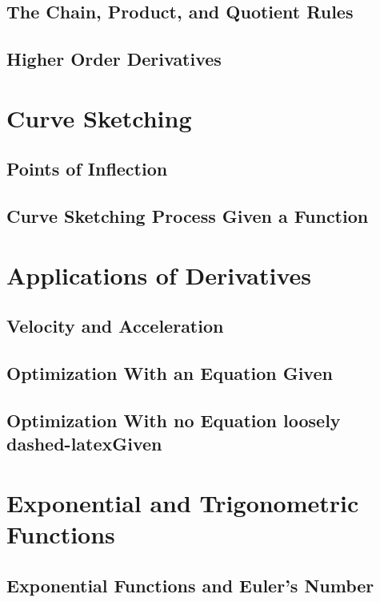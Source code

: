 \documentclass[12.5pt]{article}
\begin{document}
        \subsection{The Chain, Product, and Quotient Rules}
        \subsection{Higher Order Derivatives}

    \section{Curve Sketching}
        \subsection{Points of Inflection}
        \subsection{Curve Sketching Process Given a Function}
    
    \section{Applications of Derivatives}
        \subsection{Velocity and Acceleration}
        \subsection{Optimization With an Equation Given}
        \subsection{Optimization With no Equation loosely dashed-latexGiven}

    \section{Exponential and Trigonometric Functions}
    \subsection{Exponential Functions and Euler's Number}
\end{document}
